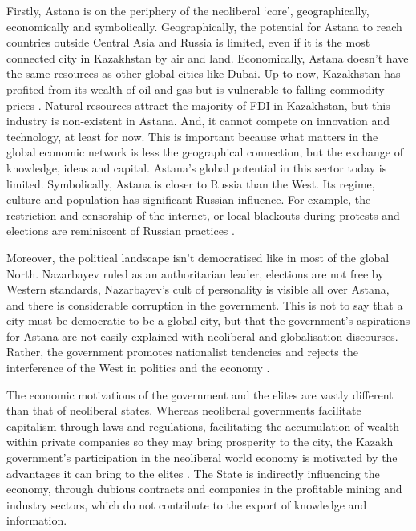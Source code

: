 \documentclass{article}
\begin{document}
Firstly, Astana is on the periphery of the neoliberal `core', geographically, economically and symbolically.  
Geographically, the potential for Astana to reach countries outside Central Asia and Russia is limited, even if it is the most connected city in Kazakhstan by air and land.
Economically, Astana doesn't have the same resources as other global cities like Dubai. Up to now, Kazakhstan has profited from its wealth of oil and gas but is vulnerable to falling commodity prices \parencite{batsaikhan2017central}. Natural resources attract the majority of FDI in Kazakhstan, but this industry is non-existent in Astana. And, it cannot compete on innovation and technology, at least for now.
This is important because what matters in the global economic network is less the geographical connection, but the exchange of knowledge, ideas and capital. Astana's global potential in this sector today is limited.
Symbolically, Astana is closer to Russia than the West. Its regime, culture and population has significant Russian influence. For example, the restriction and censorship of the internet, or local blackouts during protests and elections are reminiscent of Russian practices \parencite{freedomhouse2021}.

Moreover, the political landscape isn't democratised like in most of the global North. Nazarbayev ruled as an authoritarian leader, elections are not free by Western standards, Nazarbayev's cult of personality is visible all over Astana, and there is considerable corruption in the government. This is not to say that a city must be democratic to be a global city, but that the government's aspirations for Astana are not easily explained with neoliberal and globalisation discourses. Rather, the government promotes nationalist tendencies and rejects the interference of the West in politics and the economy \parencite{koch2013not}. 

The economic motivations of the government and the elites are vastly different than that of neoliberal states. Whereas neoliberal governments facilitate capitalism through laws and regulations, facilitating the accumulation of wealth within private companies so they may bring prosperity to the city, the Kazakh government's participation in the neoliberal world economy is motivated by the advantages it can bring to the elites \parencite{gallo2021three}. The State is indirectly influencing the economy, through dubious contracts and companies in the profitable mining and industry sectors, which do not contribute to the export of knowledge and information.
\end{document}
